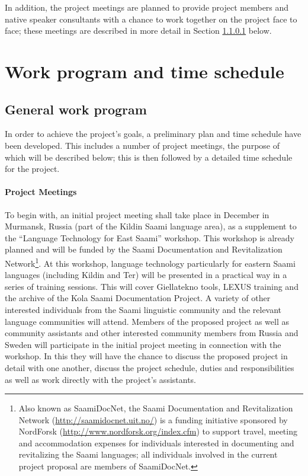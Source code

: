 \documentclass[a4paper,12pt]{article}
\begin{document}
{{{{In addition, the project meetings are planned to provide project members and native speaker consultants with a chance to work together on the project face to face; these meetings are described in more detail in Section \ref{meetings} below.

\section{Work program and time schedule}
\subsection{General work program}

In order to achieve the project's goals, a preliminary plan and time schedule have been developed. This includes a number of project meetings, the purpose of which will be described below; this is then followed by a detailed time schedule for the project.

\paragraph{Project Meetings}\label{meetings}
To begin with, an initial project meeting shall take place in December in Murmansk, Russia (part of the Kildin Saami language area), as a supplement to the “Language Technology for East Saami” workshop. This workshop is already planned and will be funded by the Saami Documentation and Revitalization Network\footnote{Also known as SaamiDocNet, the Saami Documentation and Revitalization Network (\url{http://saamidocnet.uit.no/}) is a funding initiative sponsored by NordForsk (\url{http://www.nordforsk.org/index.cfm}) to support travel, meeting and accommodation expenses for individuals interested in documenting and revitalizing the Saami languages; all individuals involved in the current project proposal are members of SaamiDocNet.}. At this workshop, language technology particularly for eastern Saami languages (including Kildin and Ter) will be presented in a practical way in a series of training sessions. This will cover Giellatekno tools, LEXUS training and the archive of the Kola Saami Documentation Project. A variety of other interested individuals from the Saami linguistic community and the relevant language communities will attend. Members of the proposed project as well as community assistants and other interested community members from Russia and Sweden will participate in the initial project meeting in connection with the workshop. In this they will have the chance to discuss the proposed project in detail with one another, discuss the project schedule, duties and responsibilities as well as work directly with the project's assistants.

}}}}
\end{document}
